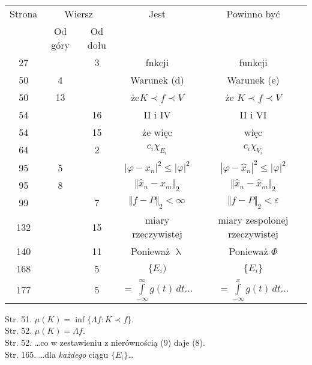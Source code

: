\documentclass[a4paper,11pt]{article}
\numberwithin{equation}{section}
\renewcommand{\lambda}{\uplambda}
\begin{document}
\begin{center}

  \begin{tabular}{|c|c|c|c|c|}
    \hline
    Strona & \multicolumn{2}{c|}{Wiersz} & Jest
                              & Powinno być \\ \cline{2-3}
    & Od góry & Od dołu & & \\
    \hline
    27  & & \hphantom{0}3 & fnkcji & funkcji \\
    50  & \hphantom{0}4 &  & Warunek (d) & Warunek (e) \\
    50  & 13 &  & że$K \prec f  \prec V$ & że $K \prec f  \prec V$ \\
    54  & & 16 & II i IV & II i VI \\
    54  & & 15 & że więc & więc \\
    64  & & \hphantom{0}2 & $c_{ i } \chi_{ E_{ i } }$ & $c_{ i } \chi_{ V_{ i } }$ \\
    95  & \hphantom{0}5 & & $| \varphi - x_{ n } |^{ 2 } \leq | \varphi |^{ 2 }$
           & $| \varphi - \hat{ x }_{ n } |^{ 2 } \leq | \varphi |^{ 2 }$ \\
    95  & \hphantom{0}8 & & $\Vert \hat{ x }_{ n } - x_{ m } \Vert_{ 2 }$
           & $\Vert \hat{ x }_{ n } - \hat{ x }_{ m } \Vert_{ 2 }$ \\
    99  & & \hphantom{0}7 & $\Vert f - P \Vert_{ 2 } < \infty$
           & $\Vert f - P \Vert_{ 2 } < \varepsilon$ \\
    132 & & 15 & miary rzeczywistej & miary zespolonej rzeczywistej \\
    140 & & 11 & Ponieważ $\lambda$ & Ponieważ $\Phi$ \\
    168 & & \hphantom{0}5 & $\{ E_{ i } )$ & $\{ E_{ i } \}$ \\
    177 & & \hphantom{0}5 & $= \int\limits^{ \infty }_{ -\infty } g( t ) \, dt \ldots$
           & $= \int\limits^{ x }_{ -\infty } g( t ) \, dt \ldots$ \\
    \hline
  \end{tabular}

\end{center}

\VerSpaceTwo


\noindent
Str. 51. $\mu( K ) = \inf\{ \Lambda f : K \prec f \}$. \\
Str. 52. $\mu( K ) = \Lambda f$. \\
Str. 52. \ldots co w zestawieniu z nierównością (9) daje (8). \\
Str. 165. \ldots dla \textit{każdego} ciągu $\{ E_{ i } \}$\ldots
\end{document}
